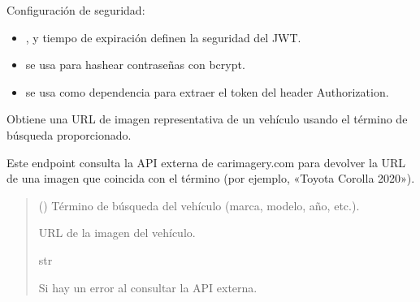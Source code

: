 \documentclass[letterpaper,10pt,spanish]{sphinxmanual}
\begin{document}

\begin{fulllineitems}
\label{\detokenize{modelos:main.fm}}
\pysigstartsignatures
\pysigline
{}
\pysigstopsignatures
\sphinxAtStartPar
Configuración de seguridad:
\begin{itemize}
\item {} 
\sphinxAtStartPar
{},  y tiempo de expiración definen la seguridad del JWT.

\item {} 
\sphinxAtStartPar
{} se usa para hashear contraseñas con bcrypt.

\item {} 
\sphinxAtStartPar
{} se usa como dependencia para extraer el token del header Authorization.

\end{itemize}

\end{fulllineitems}


\begin{fulllineitems}
\label{\detokenize{modelos:main.get_car_image}}
\pysigstartsignatures
\pysiglinewithargsret
{}
{}
{}
\pysigstopsignatures
\sphinxAtStartPar
Obtiene una URL de imagen representativa de un vehículo usando el término de búsqueda proporcionado.

\sphinxAtStartPar
Este endpoint consulta la API externa de carimagery.com para devolver la URL de una imagen que coincida con el término (por ejemplo, «Toyota Corolla 2020»).
\begin{quote}\begin{description}
\sphinxAtStartPar
{} () \textendash{} Término de búsqueda del vehículo (marca, modelo, año, etc.).

\sphinxAtStartPar
URL de la imagen del vehículo.

\sphinxAtStartPar
str

\sphinxAtStartPar
{} \textendash{} Si hay un error al consultar la API externa.

\end{description}\end{quote}

\end{fulllineitems}
\end{document}
